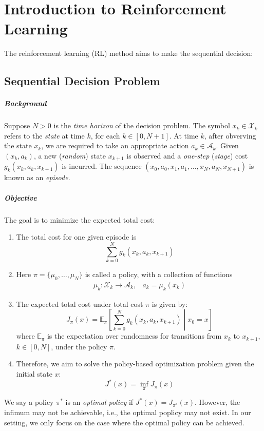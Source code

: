 \chapter{Introduction to Reinforcement Learning}

The reinforcement learning (RL) method aims to make the sequential decision:

\section{Sequential Decision Problem}
\paragraph{Background}
Suppose $N>0$ is the \emph{time horizon} of the decision problem. 
The symbol $x_k\in\mathcal{X}_k$ refers to the \emph{state} at time $k$, for each $k\in[0,N+1]$. 
At time $k$, after obverving the state $x_k$, we are required to take an appropriate action $a_k\in\mathcal{A}_k$. 
Given $(x_k,a_k)$, a new (\emph{random}) state $x_{k+1}$ is observed and a \emph{one-step} (\emph{stage}) cost $g_k(x_k,a_k,x_{k+1})$ is incurred.
The sequence $(x_0,a_0,x_1,a_1,\dots,x_N,a_N,x_{N+1})$ is known as an \emph{episode}.
\paragraph{Objective}
The goal is to minimize the expected total cost:
\begin{enumerate}
\item
The total cost for one given episode is
\begin{equation}
\sum_{k=0}^Ng_k(x_k,a_k,x_{k+1})
\end{equation}
\item
Here $\pi=\{\mu_0,\dots,\mu_N\}$ is called a policy, with a collection of functions 
\begin{equation}
\begin{array}{ll}
\mu_k:\mathcal{X}_k\to\mathcal{A}_k,
&
a_k=\mu_k(x_k)
\end{array}
\end{equation}
\item
The expected total cost under total cost $\pi$ is given by:
\begin{equation}
J_{\pi}(x)=\mathbb{E}_{\pi}\left[
\sum_{k=0}^Ng_k(x_k,a_k,x_{k+1})\middle| x_0=x
\right]
\end{equation}
where $\mathbb{E}_{\pi}$ is the expectation over randomness for transitions from $x_k$ to $x_{k+1}$, $k\in[0,N]$, under the policy $\pi$.
\item
Therefore, we aim to solve the policy-based optimization problem given the initial state $x$:
\begin{equation}
J^*(x)=\inf_{\pi}J_{\pi}(x)
\end{equation}
\end{enumerate}
We say a policy $\pi^*$ is an \emph{optimal policy} if $J^*(x)=J_{\pi^*}(x)$. However, the infimum may not be achievable, i.e., the optimal poplicy may not exist. In our setting, we only focus on the case where the optimal policy can be achieved.



